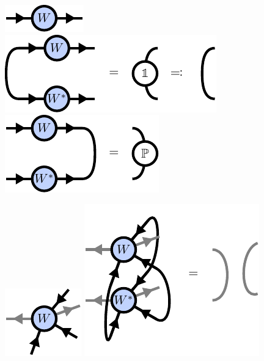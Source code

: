 \begin{figure}
	\centering
	\begin{minipage}[b]{0.4\textwidth}
		\centering
		\subcaptionbox{\label{fig:basic_isometries_isometric_matrix}}
		{%
			\includegraphics[scale=1]{figures/tikz/Tensor_Networks/basic_isometries/basic_isometries_a.pdf}
		}
		\subcaptionbox{\label{fig:basic_isometries_isometric_matrix}}
		{%
			\includegraphics[scale=1]{figures/tikz/Tensor_Networks/basic_isometries/basic_isometries_b.pdf}
		}
		\subcaptionbox{\label{fig:basic_isometries_isometric_matrix}}
		{%
			\includegraphics[scale=1]{figures/tikz/Tensor_Networks/basic_isometries/basic_isometries_c.pdf}
		}
	\end{minipage}
	\quad\quad\quad
	\begin{minipage}[b]{0.4\textwidth}
		\centering
		\subcaptionbox{\label{fig:basic_isometries_isometric_matrix}}
		{%
			\includegraphics[scale=1]{figures/tikz/Tensor_Networks/basic_isometries/basic_isometries_d.pdf}
		}
		\subcaptionbox{\label{fig:basic_isometries_isometric_matrix}}
		{%
			\includegraphics[scale=1]{figures/tikz/Tensor_Networks/basic_isometries/basic_isometries_e.pdf}
}
\end{minipage}
\end{figure}
